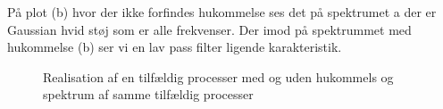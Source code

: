  På plot (b) hvor der ikke forfindes hukommelse ses det på spektrumet a der er Gaussian hvid støj som er alle frekvenser. Der imod på spektrummet med hukommelse (b) ser vi en lav pass filter ligende karakteristik.  
 \begin{figure}[!h]
	\centering
	\caption{Realisation af en tilfældig processer med og uden hukommels og spektrum af samme tilfældig processer  }
	\label{fig:part2_markov}
\end{figure}

